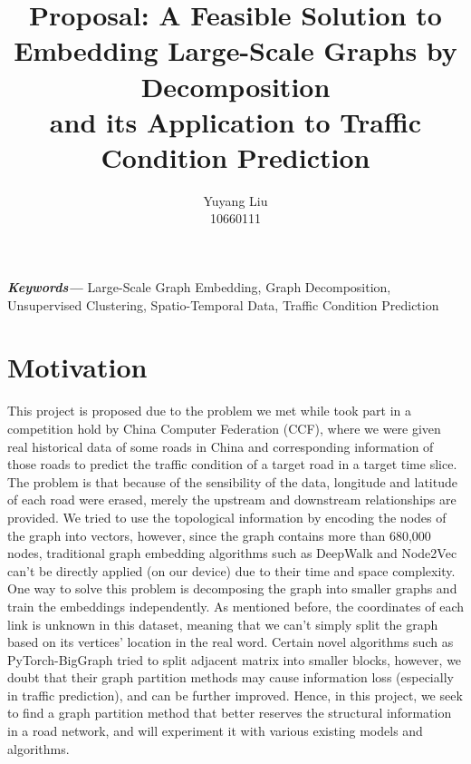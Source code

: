\documentclass[11pt]{article}
\providecommand{\keywords}[1]
{
  \small	
  \textbf{\textit{Keywords---}} #1
}
\begin{document}
\title{Proposal: A Feasible Solution to \\Embedding Large-Scale Graphs by Decomposition \\
and its Application to Traffic Condition Prediction}
\author{Yuyang Liu \\ 10660111}
\maketitle
\keywords{Large-Scale Graph Embedding, Graph Decomposition, Unsupervised Clustering, Spatio-Temporal Data, Traffic Condition Prediction}

\section{Motivation}
\label{sec:motivation}
This project is proposed due to the problem we met while took part in a competition hold by China Computer Federation (CCF), where we were given real historical data of some roads in China and corresponding information of those roads to predict the traffic condition of a target road in a target time slice. The problem is that because of the sensibility of the data, longitude and latitude of each road were erased, merely the upstream and downstream relationships are provided. We tried to use the topological information by encoding the nodes of the graph into vectors, however, since the graph contains more than 680,000 nodes, traditional graph embedding algorithms such as DeepWalk \cite{perozzi2014deepwalk} and Node2Vec \cite{grover2016node2vec} can't be directly applied (on our device) due to their time and space complexity. One way to solve this problem is decomposing the graph into smaller graphs and train the embeddings independently. As mentioned before, the coordinates of each link is unknown in this dataset, meaning that we can't simply split the graph based on its vertices' location in the real word. Certain novel algorithms such as PyTorch-BigGraph \cite{lerer2019pytorch} tried to split adjacent matrix into smaller blocks, however, we doubt that their graph partition methods may cause information loss (especially in traffic prediction), and can be further improved. Hence, in this project, we seek to find a graph partition method that better reserves the structural information in a road network, and will experiment it with various existing models and algorithms.
\end{document}
